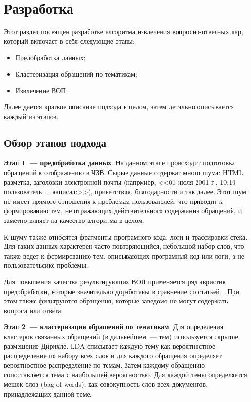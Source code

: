 \chapter{Разработка}
\label{chap:dev}

Этот раздел посвящен разработке алгоритма извлечения вопросно-ответных пар, который включает в себя следующие этапы:

\begin{itemize}
\item Предобработка данных;
\item Кластеризация обращений по тематикам;
\item Извлечение ВОП.
\end{itemize}

Далее дается краткое описание подхода в целом, затем детально описывается каждый из этапов.

\section{Обзор этапов подхода}
\label{sec:overview}

\textbf{Этап 1~--- предобработка данных}. На данном этапе происходит подготовка обращений к отображению в ЧЗВ. Сырые данные содержат много шума: HTML разметка, заголовки электронной почты (напрмиер, <<01 июля 2001 г., 10:10 пользователь ... написал:>>), приветствия, благодарности и так далее. Этот шум не имеет прямого отношения к проблемам пользователей, что приводит к формированию тем, не отражающих действительного содержания обращений, и заметно влияет на качество алгоритма в целом. 

К шуму также относятся фрагменты програмного кода, логи и трассировки стека. Для таких данных характерен часто повторяющийся, небольшой набор слов, что также ведет к формированию тем, описывающих програмный код или логи, а не пользовательсике проблемы.

Для повышения качества результирующих ВОП применяется ряд эвристик предобработки, которые значительно доработаны в сравнение со статьей~\cite{original}. При этом также фильтруются обращения, которые заведомо не могут содержать вопроса или ответа. 

\textbf{Этап 2~--- кластеризация обращений по тематикам}. Для определения кластеров связанных обращений (в дальнейшем~--- тем) используется скрытое размещение Дирихле. LDA описывает каждую тему как вероятностное распределение по набору всех слов и для каждого обращения определяет вероятностное распределение по темам. Затем каждому обращению сопоставляется тема с наибольшей вероятностью. Для каждой темы определяется мешок слов (bag-of-words), как совокупность слов всех документов, принадлежащих данной теме. 

